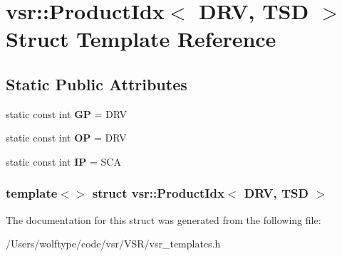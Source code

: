 \hypertarget{structvsr_1_1_product_idx_3_01_d_r_v_00_01_t_s_d_01_4}{\section{vsr\-:\-:Product\-Idx$<$ D\-R\-V, T\-S\-D $>$ Struct Template Reference}
\label{structvsr_1_1_product_idx_3_01_d_r_v_00_01_t_s_d_01_4}
}
\subsection*{Static Public Attributes}
\begin{DoxyCompactItemize}
\item 
\hypertarget{structvsr_1_1_product_idx_3_01_d_r_v_00_01_t_s_d_01_4_a01c6e1c822fd33e3f02478566eb46ebd}{static const int {\bfseries G\-P} = D\-R\-V}\label{structvsr_1_1_product_idx_3_01_d_r_v_00_01_t_s_d_01_4_a01c6e1c822fd33e3f02478566eb46ebd}

\item 
\hypertarget{structvsr_1_1_product_idx_3_01_d_r_v_00_01_t_s_d_01_4_ab16ef8f696ecb877bb2dcc2c58ca9d9f}{static const int {\bfseries O\-P} = D\-R\-V}\label{structvsr_1_1_product_idx_3_01_d_r_v_00_01_t_s_d_01_4_ab16ef8f696ecb877bb2dcc2c58ca9d9f}

\item 
\hypertarget{structvsr_1_1_product_idx_3_01_d_r_v_00_01_t_s_d_01_4_a665986e225c629d541955cc6a12eae67}{static const int {\bfseries I\-P} = S\-C\-A}\label{structvsr_1_1_product_idx_3_01_d_r_v_00_01_t_s_d_01_4_a665986e225c629d541955cc6a12eae67}

\end{DoxyCompactItemize}
\subsubsection*{template$<$$>$ struct vsr\-::\-Product\-Idx$<$ D\-R\-V, T\-S\-D $>$}



The documentation for this struct was generated from the following file\-:\begin{DoxyCompactItemize}
\item 
/\-Users/wolftype/code/vsr/\-V\-S\-R/vsr\-\_\-templates.\-h\end{DoxyCompactItemize}
